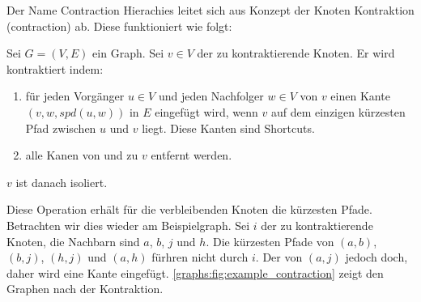 Der Name Contraction Hierachies leitet sich aus Konzept der Knoten Kontraktion (contraction) ab.
Diese funktioniert wie folgt:

\begin{definition}
    Sei $G = (V, E)$ ein Graph. Sei $v \in V$ der zu kontraktierende Knoten. Er wird kontraktiert indem:

    \begin{enumerate}
        \item\label{ch:contraction:when_shortcut}
        für jeden Vorgänger $u \in V$ und jeden Nachfolger $w \in V$ von $v$ einen Kante $(v, w, {spd}(u, w))$ in $E$ eingefügt wird, wenn $v$ auf dem einzigen kürzesten Pfad zwischen $u$ und $v$ liegt. Diese Kanten sind Shortcuts.

        \item
              alle Kanen von und zu $v$ entfernt werden.
    \end{enumerate}

    $v$ ist danach isoliert.
\end{definition}

Diese Operation erhält für die verbleibenden Knoten die kürzesten Pfade.
Betrachten wir dies wieder am Beispielgraph.
Sei $i$ der zu kontraktierende Knoten, die Nachbarn sind $a$, $b$, $j$ und $h$.
Die kürzesten Pfade von $(a, b)$, $(b, j)$, $(h, j)$ und $(a, h)$ fürhren nicht durch $i$.
Der von $(a, j)$ jedoch doch, daher wird eine Kante eingefügt.
\autoref{graphs:fig:example_contraction} zeigt den Graphen nach der Kontraktion.


